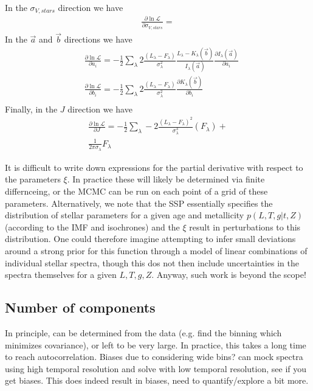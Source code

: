 \documentclass{emulateapj}
\begin{document}
In the $\sigma_{V, stars}$ direction we have
\begin{equation}
\begin{split}
\frac{\partial \ln\mathcal{L}}{\partial \sigma_{V,stars}} = 
\end{split}
\end{equation}
In the $\vec{a}$ and  $\vec{b}$ directions we have
\begin{equation}
\begin{split}
&\frac{\partial \ln\mathcal{L}}{\partial a_i} = -\frac{1}{2}\sum\limits_\lambda 2 \frac{(L_\lambda- F_\lambda)}{\sigma_\lambda^2} \frac{L_\lambda- K_\lambda(\vec{b})}{I_\lambda(\vec{a})}\frac{\partial I_\lambda(\vec{a})}{\partial a_i}\\
&\frac{\partial \ln\mathcal{L}}{\partial b_i} = -\frac{1}{2}\sum\limits_\lambda 2 \frac{(L_\lambda- F_\lambda)}{\sigma_\lambda^2}\frac{\partial K_\lambda(\vec{b})}{\partial b_i}\\
\end{split}
\end{equation}
Finally, in the $J$ direction we have
\begin{equation}
\begin{split}
\frac{\partial \ln\mathcal{L}}{\partial J} = -\frac{1}{2}\sum\limits_\lambda -2 \frac{(L_\lambda- F_\lambda)^2}{\sigma_\lambda^3} (F_\lambda) + \\
\frac{1}{2\pi \sigma_\lambda}
F_\lambda
\end{split}
\end{equation}

It is difficult to write down expressions for the partial derivative with respect to the parameters $\xi$.  In practice these will likely be determined via finite differnceing, or the MCMC can be run on each point of a grid of these parameters.  Alternatively, we note that the SSP essentially specifies the distribution of stellar parameters for a given age and metallicity $p(L, T, g | t, Z)$ (according to the IMF and isochrones) and the $\xi$ result in perturbations to this distribution.  One could therefore imagine attempting to infer small deviations around a strong prior for this function through a model of linear combinations of individual stellar spectra, though this dos not then include uncertainties in the spectra themselves for a given $L,T,g, Z$.  Anyway, such work is beyond the scope!


\subsection{Number of components}
In principle, can be determined from the data (e.g. find the binning which minimizes covariance), or left to be very large.  In practice, this takes a long time to reach autocorrelation. Biases due to considering wide bins?  can mock spectra using high temporal resolution and solve with low temporal resolution, see if you get biases.  This does indeed result in biases, need to quantify/explore a bit more.
\end{document}
